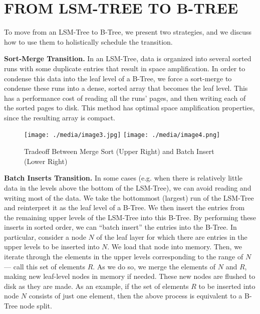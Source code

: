 \documentclass[a4paper,12pt,notitlepage,twoside,openright]{article}
\begin{document}
\hypertarget{fromlsm-treetob-tree}{%
\section{FROM LSM-TREE TO B-TREE}\label{fromlsm-treetob-tree}}

To move from an LSM-Tree to B-Tree, we present two strategies, and we
discuss how to use them to holistically schedule the transition.

\textbf{Sort-Merge Transition.} In an LSM-Tree, data is organized into
several sorted runs with some duplicate entries that result in space
amplification. In order to condense this data into the leaf level of a
B-Tree, we force a sort-merge to condense these runs into a dense,
sorted array that becomes the leaf level. This has a performance cost of
reading all the runs' pages, and then writing each of the sorted pages
to disk. This method has optimal space amplification properties, since
the resulting array is compact.

\begin{figure}
  \centering
  \begin{minipage}[t]{0.9\columnwidth}
    \texttt{[image: ./media/image3.jpg]}
    \texttt{[image: ./media/image4.png]}
  \end{minipage}
  \caption{Tradeoff Between Merge Sort (Upper Right) and Batch Insert (Lower Right)}
\end{figure}

\textbf{Batch Inserts Transition.} In some cases (e.g. when there is relatively
little data in the levels above the bottom of the LSM-Tree), we can
avoid reading and writing most of the data. We take the bottommost
(largest) run of the LSM-Tree and reinterpret it as the leaf level of a
B-Tree. We then insert the entries from the remaining upper levels of
the LSM-Tree into this B-Tree. By performing these inserts in sorted
order, we can ``batch insert'' the entries into the B-Tree. In
particular, consider a node \(N\) of the leaf layer for which there
are entries in the upper levels to be inserted into \(N\). We load
that node into memory. Then, we iterate through the elements in the
upper levels corresponding to the range of \(N\) --- call this set of
elements \(R\). As we do so, we merge the elements of \(N\) and
\(R\), making new leaf-level nodes in memory if needed. These new
nodes are flushed to disk as they are made. As an example, if the set of
elements \(R\) to be inserted into node \(N\) consists of just one
element, then the above process is equivalent to a B-Tree node split.
\end{document}
